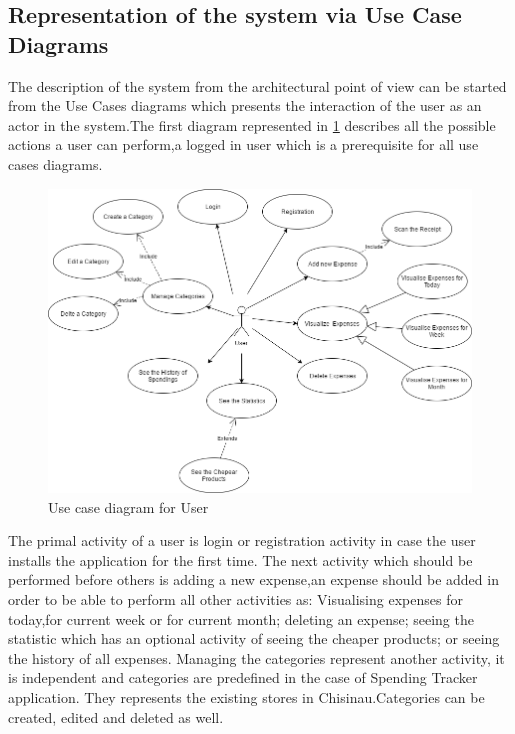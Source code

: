 \subsection{Representation of the system via Use Case Diagrams}
The description of the system from the architectural point of view can be started from the Use Cases diagrams which presents the interaction of the user as an actor in the system.The first diagram represented in \ref{fig:firstusecase} describes all the possible actions a user can perform,a logged in user which is a prerequisite for all use cases diagrams.
\begin{figure}[H]
	\centering
	\includegraphics[width=18cm]{Chapter2/usecase1.png}
	\caption{Use case diagram for User}
	\label{fig:firstusecase}
\end{figure}
The primal activity of a user is login or registration activity in case the user installs the application for the first time. The next activity which should be performed before others is adding a new expense,an expense should be added in order to be able to perform all other activities as: 
Visualising expenses for today,for current week or for current month; deleting an expense; seeing the statistic which has an optional activity of seeing the cheaper products; or seeing the history of all expenses. Managing the categories represent another activity, it is independent and categories are predefined in the case of Spending Tracker application. They represents the existing stores in Chisinau.Categories can be created, edited and deleted as well.

